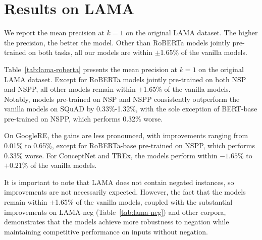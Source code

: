 \section{Results on LAMA}
\label{app:lamaresults}

\begin{table*}
    \centering
    
    \caption{
      We report the mean precision at $k = 1$ on the original LAMA dataset.
      The higher the precision, the better the model.
      Other than {RoBERTa} models jointly pre-trained on both tasks, 
      all our models are within $\pm$1.65\% of the vanilla models. 
      \label{tab:lama-roberta}
    }
  \end{table*}

Table~\ref{tab:lama-roberta} presents the mean precision at $k = 1$ on the original LAMA dataset. 
Except for {RoBERTa} models jointly pre-trained on both NSP and NSPP, 
all other models remain within $\pm$1.65\% of the vanilla models. 
Notably, models pre-trained on NSP and NSPP consistently outperform the vanilla models on {SQuAD} by 0.33\%-1.32\%,
with the sole exception of {BERT-base} pre-trained on NSPP, which performs 0.32\% worse.

On {GoogleRE}, the gains are less pronounced, with improvements ranging from 0.01\% to 0.65\%, 
except for {RoBERTa-base} pre-trained on NSPP, which performs 0.33\% worse. 
For ConceptNet and TREx, the models perform within $-1.65\%$ to $+0.21\%$ of the vanilla models.

It is important to note that LAMA does not contain negated instances, 
so improvements are not necessarily expected. 
However, the fact that the models remain within $\pm$1.65\% of the vanilla models, 
coupled with the substantial improvements on LAMA-neg (Table~\ref{tab:lama-neg}) 
and other corpora, 
demonstrates that the models achieve more robustness to negation while maintaining competitive performance on inputs without negation.